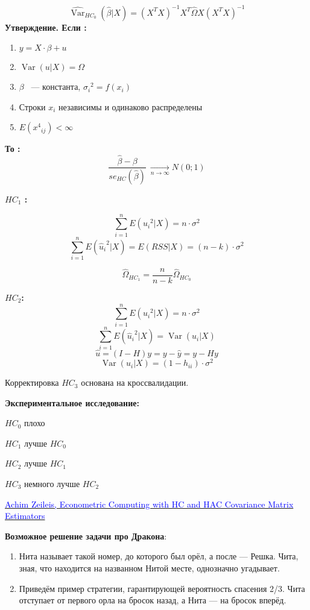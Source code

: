 \documentclass[12pt]{article} %
\theoremstyle{definition} %
\DeclareMathOperator{\Var}{Var}
\begin{document}
\[{\hat{\Var}}_{HC_0} (\hat{\beta}|X) = (X^T X)^{-1} X^T \hat{\Omega} X (X^T X) ^ {-1}   \]
\textbf{Утверждение. Если :}
\begin{enumerate}

\item  $y = X \cdot \beta + u$
\item  $\Var(u|X) = \Omega $
\item  $\beta$ ~---  константа, $ {{\sigma}_i}^2 = f(x_i)$ 
\item  Строки $x_i$ независимы и одинаково распределены
\item  $E({x^4}_{ij}) < \infty$
\end{enumerate}

\textbf{То :}
\[ \frac{ \hat{\beta} - \beta }{se_{HC}(\hat{\beta})}  \:\xrightarrow[n\longrightarrow \infty]\: N(0;1)\]


\textbf{$HC_1$ :}

\[ \sum_{i=1}^n E(  {u_i}^2     | X        )  = n \cdot {\sigma}^2\]
\[ \sum_{i=1}^n E(  {{\hat{u}}_i}^2     | X        )  = E(RSS|X) = (n-k) \cdot  {\sigma}^2\]

 \[{\hat{\Omega}}_{HC_1} = \frac{n} {n-k} {\hat{\Omega}}_{HC_0}  \]


\textbf{$HC_2$:} 
\[ \sum_{i=1}^n E(  {u_i}^2     | X        )  = n \cdot {\sigma}^2\]
\[ \sum_{i=1}^n E(  {{\hat{u}}_i}^2     | X        )  =  \Var( {\hat{u}_i}|X) \]
\[\hat{u} = (I-H)y = y - \hat{y} = y-Hy\]
\[\Var(u_i |X) = (1 - h_{ii}) \cdot {\sigma}^2\]


Корректировка $HC_3$ основана на кроссвалидации.


\textbf{Экспериментальное исследование: }
\par
$HC_0$ плохо
\par
$HC_1$ лучше $HC_0$
\par
$HC_2$ лучше $HC_1$
\par
$HC_3$ немного лучше $HC_2$
\par

\begin{thebibliography}{99}

\href{https://cran.r-project.org/web/packages/sandwich/vignettes/sandwich.pdf} {\textcolor{blue}{Achim Zeileis,
Econometric Computing with HC and HAC 
Covariance Matrix Estimators}}

\end{thebibliography}
\par\textbf{Возможное решение задачи про Дракона}:
\begin{enumerate} 
\item{Нита называет такой номер, до которого был орёл, а после —
Решка. Чита, зная, что находится на названном Нитой месте,
однозначно угадывает.}
\item{Приведём пример стратегии, гарантирующей вероятность спасения 2/3. Чита отступает от первого орла на бросок назад, а Нита — на бросок вперёд.}
\end{enumerate}
\end{document}
